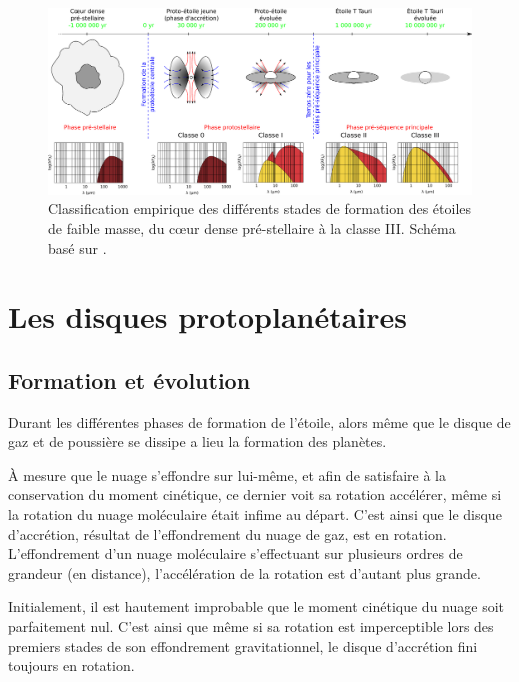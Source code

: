 \begin{figure}[htbp]
\centering
\includegraphics[width=\linewidth]{figure/star_formation.pdf}
\caption[Stades de formation d'une étoile]{Classification empirique des différents stades de formation des étoiles de faible
masse, du cœur dense pré-stellaire à la classe III. Schéma basé sur \citep{andre2002initial}. }\label{fig:star_formation}
\end{figure}


\section{Les disques protoplanétaires}
\subsection{Formation et évolution}
Durant les différentes phases de formation de l'étoile, alors même que le disque de gaz et de poussière se dissipe a lieu la formation des planètes. 

À mesure que le nuage s'effondre sur lui-même, et afin de satisfaire à la conservation du moment cinétique, ce dernier voit sa rotation accélérer, même si la rotation du nuage moléculaire était infime au départ. C'est ainsi que le disque d'accrétion, résultat de l'effondrement du nuage de gaz, est en rotation. L'effondrement d'un nuage moléculaire s'effectuant sur plusieurs ordres de grandeur (en distance), l'accélération de la rotation est d'autant plus grande.

Initialement, il est hautement improbable que le moment cinétique du nuage soit parfaitement nul. C'est ainsi que même si sa rotation est imperceptible lors des premiers stades de son effondrement gravitationnel, le disque d'accrétion fini toujours en rotation. 

